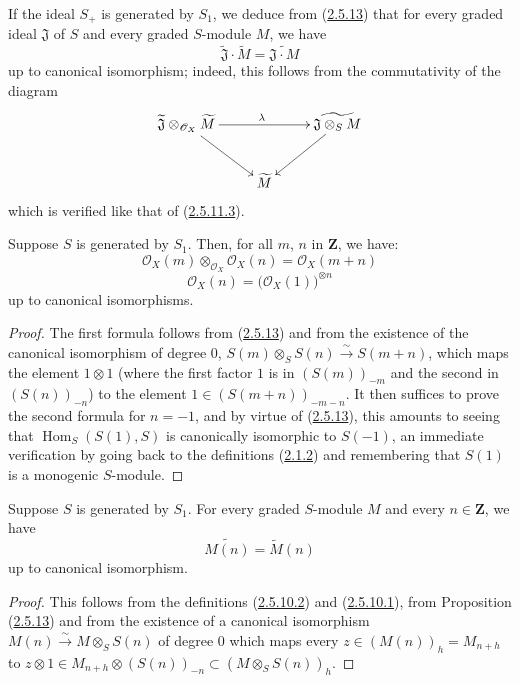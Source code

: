 If the ideal $S_+$ is generated by $S_1$, we deduce from
(\hyperref[II.2.5.13]{2.5.13}) that for every graded ideal $\mathfrak{J}$
of $S$ and every graded $S$-module $M$, we have
\[
\label{II.2.5.13.1}
  \widetilde{\mathfrak{J}}\cdot\widetilde{M}
  =\widetilde{\mathfrak{J}\cdot M}
\tag{2.5.13.1}
\]
up to canonical isomorphism; indeed, this follows from the commutativity
of the diagram
\[
  \xymatrix{
    \widetilde{\mathfrak{J}}\otimes_{\mathcal{O}_X}\widetilde{M}
    \ar[rr]^\lambda\ar[dr]
    && \widetilde{\mathfrak{J}\otimes_S M}\ar[dl]\\
    & \widetilde{M} &
  }
\]
which is verified like that of
(\hyperref[II.2.5.11.3]{2.5.11.3}).

\begin{corollary}[2.5.14]
\label{II.2.5.14}
Suppose $S$ is generated by $S_1$. Then, for all $m$, $n$ in
$\mathbf{Z}$, we have:
\[
\label{II.2.5.14.1}
  \mathcal{O}_X(m)\otimes_{\mathcal{O}_X}\mathcal{O}_X(n)
  =\mathcal{O}_X(m+n)
\tag{2.5.14.1}
\]
\[
\label{II.2.5.14.2}
  \mathcal{O}_X(n)=\bigl(\mathcal{O}_X(1)\bigr)^{\otimes n}
\tag{2.5.14.2}
\]
up to canonical isomorphisms.
\end{corollary}

\begin{proof}
The first formula follows from (\hyperref[II.2.5.13]{2.5.13}) and from
the existence of the canonical isomorphism of degree $0$,
$S(m)\otimes_S S(n)\xrightarrow{\sim}S(m+n)$, which maps the element
$1\otimes 1$ (where the first factor $1$ is in $(S(m))_{-m}$ and the second
in $(S(n))_{-n}$) to the element
$1\in(S(m+n))_{-m-n}$. It then suffices to prove the second formula
for $n=-1$, and by virtue of (\hyperref[II.2.5.13]{2.5.13}), this amounts
to seeing that $\operatorname{Hom}_S(S(1),S)$ is canonically isomorphic to
$S(-1)$, an immediate verification by going back to the definitions
(\hyperref[II.2.1.2]{2.1.2}) and remembering that $S(1)$ is a
monogenic $S$-module.
\end{proof}

\begin{corollary}[2.5.15]
\label{II.2.5.15}
Suppose $S$ is generated by $S_1$. For every graded $S$-module $M$ and
every $n\in\mathbf{Z}$, we have
\[
\label{II.2.5.15.1}
  \widetilde{M(n)}=\widetilde{M}(n)
\tag{2.5.15.1}
\]
up to canonical isomorphism.
\end{corollary}

\begin{proof}
This follows from the definitions (\hyperref[II.2.5.10.2]{2.5.10.2}) and
(\hyperref[II.2.5.10.1]{2.5.10.1}), from Proposition
(\hyperref[II.2.5.13]{2.5.13}) and from the existence of a canonical
isomorphism $M(n)\xrightarrow{\sim}M\otimes_S S(n)$ of degree $0$ which maps
every $z\in(M(n))_h=M_{n+h}$ to
$z\otimes1\in M_{n+h}\otimes(S(n))_{-n}\subset(M\otimes_S S(n))_h$.
\end{proof}

